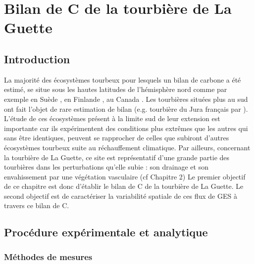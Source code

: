 \chapter{Bilan de C de la tourbière de La Guette}

\minitoc

\newpage

\section{Introduction}
La majorité des écosystèmes tourbeux pour lesquels un bilan de carbone a été estimé, se situe sous les hautes latitudes de l'hémisphère nord comme par exemple en Suède \citep{waddington2000,peichl2014}, en Finlande \citep{Alm1997}, au Canada \citep{trudeau2014}.
Les tourbières situées plus au sud ont fait l'objet de rare estimation de bilan (e.g. tourbière du Jura français par \citet{bortoluzzi2006}).
L'étude de ces écosystèmes présent à la limite sud de leur extension est importante car ils expérimentent des conditions plus extrêmes que les autres qui sans être identiques, peuvent se rapprocher de celles que subiront d'autres écosystèmes tourbeux suite au réchauffement climatique.
Par ailleurs, concernant la tourbière de La Guette, ce site est représentatif d'une grande partie des tourbières dans les perturbations qu'elle subie : son drainage et son envahissement par une végétation vasculaire (cf Chapitre 2)
Le premier objectif de ce chapitre est donc d'établir le bilan de C de la tourbière de La Guette.
Le second objectif est de caractériser la variabilité spatiale de ces flux de GES à travers ce bilan de C.

\section{Procédure expérimentale et analytique}

\subsection{Méthodes de mesures}

